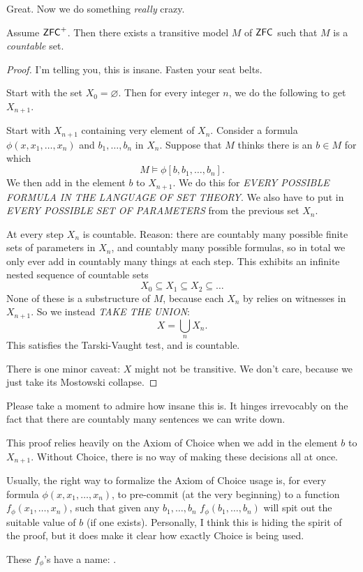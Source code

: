 Great. Now we do something \emph{really} crazy.
\begin{theorem}
	Assume $\mathsf{ZFC}^+$. Then there exists a transitive model $M$ of $\mathsf{ZFC}$
	such that $M$ is a \emph{countable} set.
\end{theorem}
\begin{proof}
	I'm telling you, this is insane. Fasten your seat belts.

	Start with the set $X_0 = \varnothing$.
	Then for every integer $n$, we do the following to get $X_{n+1}$.
	\begin{itemize}
		\ii Start with $X_{n+1}$ containing very element of $X_n$.
		\ii Consider a formula $\phi(x, x_1, \dots, x_n)$
		and $b_1, \dots, b_n$ in $X_n$.
		Suppose that $M$ thinks there is an $b \in M$ for which
		\[ M \vDash \phi[b, b_1, \dots, b_n]. \]
		We then add in the element $b$ to $X_{n+1}$.
		\ii We do this for \emph{EVERY POSSIBLE FORMULA IN THE LANGUAGE OF SET THEORY}.
		We also have to put in \emph{EVERY POSSIBLE SET OF PARAMETERS} from the previous set $X_n$.
	\end{itemize}
	At every step $X_n$ is countable.
	Reason: there are countably many possible finite sets of parameters in $X_n$,
	and countably many possible formulas, so in total we only ever add in countably many things
	at each step.
	This exhibits an infinite nested sequence of countable sets
	\[ X_0 \subseteq X_1 \subseteq X_2 \subseteq \dots \]
	None of these is a substructure of $M$, because each $X_n$ by relies on witnesses in $X_{n+1}$.
	So we instead \emph{TAKE THE UNION}:
	\[ X = \bigcup_n X_n. \]
	This satisfies the Tarski-Vaught test, and is countable.

	There is one minor caveat: $X$ might not be transitive.
	We don't care, because we just take its Mostowski collapse.
\end{proof}

Please take a moment to admire how insane this is.
It hinges irrevocably on the fact that there are countably many sentences we can write down.

\begin{remark}
	This proof relies heavily on the Axiom of Choice
	when we add in the element $b$ to $X_{n+1}$.
	Without Choice, there is no way of making these decisions all at once.

	Usually, the right way to formalize the Axiom of Choice usage is,
	for every formula $\phi(x, x_1, \dots, x_n)$, to pre-commit (at the very beginning)
	to a function $f_\phi(x_1, \dots, x_n)$, such that given any $b_1, \dots, b_n$
	$f_\phi(b_1, \dots, b_n)$ will spit out the suitable value of $b$ (if one exists).
	Personally, I think this is hiding the spirit of the proof, but it does
	make it clear how exactly Choice is being used.

	These $f_\phi$'s have a name: .
\end{remark}

